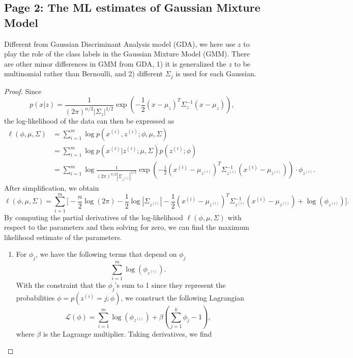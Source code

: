 \documentclass{article}
\begin{document}
\subsection{Page 2: The ML estimates of Gaussian Mixture Model}
Different from Gaussian Discriminant Analysis model (GDA), we here use $z$ to play the role of the class labels in the Gaussian Mixture Model (GMM). There are other minor differences in GMM from GDA, 1) it is generalized the $z$ to be multinomial rather than Bernoulli, and 2) different $\Sigma_j$ is used for each Gaussian.
\begin{proof}
Since
            \[
            p(x|z)=\frac{1}{(2\pi)^{n/2}|\Sigma_z|^{1/2}}\exp{\left(-\frac{1}{2}(x-\mu_z)^T\Sigma_z^{-1}(x-\mu_z)\right)},
            \]
            the log-likelihood of the data can then be expressed as
            \[
            \begin{split}
            \ell(\phi,\mu,\Sigma)
            &=\sum_{i=1}^{m}\log p(x^{(i)},z^{(i)};\phi,\mu,\Sigma)\\
            &=\sum_{i=1}^{m}\log p(x^{(i)}|z^{(i)};\mu,\Sigma)p(z^{(i)};\phi)\\
            &=\sum_{i=1}^{m}\log \frac{1}{(2\pi)^{n/2}|\Sigma_{z^{(i)}}|^{1/2}}
            \exp{\left(-\frac{1}{2}(x^{(i)}-\mu_{z^{(i)}})^T\Sigma_{z^{(i)}}^{-1}(x^{(i)}-\mu_{z^{(i)}})\right)}\cdot\phi_{z^{(i)}}.
            \end{split}
            \]
            After simplification, we obtain
            \[
            \ell(\phi,\mu,\Sigma)=\sum_{i=1}^m\Bigg[-\frac{n}{2}\log(2\pi)-\frac{1}{2}\log|\Sigma_{z^{(i)}}|%
            -\frac{1}{2}(x^{(i)}-\mu_{z^{(i)}})^T\Sigma_{z^{(i)}}^{-1}(x^{(i)}-\mu_{z^{(i)}})%
            +\log(\phi_{z^{(i)}})\Bigg].
            \]
            By computing the partial derivatives of the log-likelihood $\ell(\phi,\mu,\Sigma)$ with respect to the parameters and then solving for zero, we can find the maximum likelihood estimate of the parameters.
            \begin{enumerate}
            \item For $\phi_j$, we have the following terms that depend on $\phi_j$
            \[
            \sum_{i=1}^m\log(\phi_{z^{(i)}}).
            \]
            With the constraint that the $\phi_j$'s sum to 1 since they represent the probabilities $\phi=p(z^{(i)}=j;\phi)$, we construct the following Lagrangian
            \[
            \mathcal{L}(\phi)=\sum_{i=1}^m\log(\phi_{z^{(i)}})+\beta(\sum_{j=1}^k \phi_j-1),
            \]
            where $\beta$ is the Lagrange multiplier. Taking derivatives, we find

\end{enumerate}
\end{proof}
\end{document}
